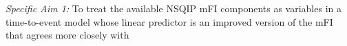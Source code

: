 \emph{Specific Aim 1:} To treat the available NSQIP mFI components as variables in a time-to-event model whose linear predictor is an improved version of the mFI that agrees more closely with 
